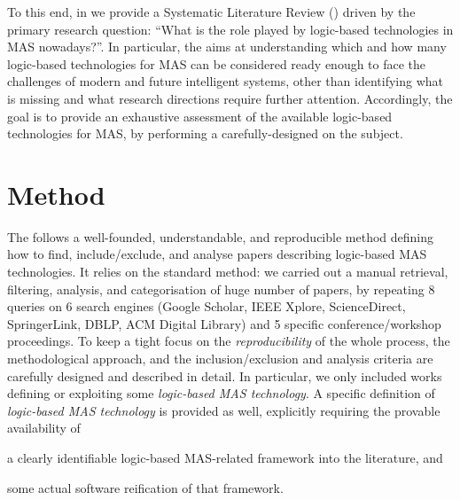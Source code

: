 \documentclass[12pt,a4paper,openright,twoside]{book}
\begin{document}
To this end, in \cite{lptech4mas-jaamas35} we provide a Systematic Literature Review (\slr{}) driven by the primary research question: ``What is the role played by logic-based technologies in MAS nowadays?''.
%
In particular, the \slr{} aims at understanding which and how many logic-based technologies for MAS can be considered ready enough to face the challenges of modern and future intelligent systems, other than identifying what is missing and what research directions require further attention.
%
Accordingly, the goal is to provide an exhaustive assessment of the available logic-based technologies for MAS, by performing a carefully-designed \slr{} on the subject.

\section{Method}

The \slr{} follows a well-founded, understandable, and reproducible method defining how to find, include/exclude, and analyse papers describing logic-based MAS technologies.
%
It relies on the standard \slr{} method: we carried out a manual retrieval, filtering, analysis, and categorisation of huge number of papers, by repeating 8 queries on 6 search engines (Google Scholar, IEEE Xplore, ScienceDirect, SpringerLink, DBLP, ACM Digital Library) and 5 specific conference/workshop proceedings.
%
To keep a tight focus on the \emph{reproducibility} of the whole process, the methodological approach, and the inclusion/exclusion and analysis criteria are carefully designed and described in detail.
%
In particular, we only included works defining or exploiting some \emph{logic-based MAS technology}.
%
A specific definition of \emph{logic-based MAS technology} is provided as well, explicitly requiring the provable availability of
%
\begin{inlinelist}
    \item a clearly identifiable logic-based MAS-related framework into the literature, and
    \item some actual software reification of that framework.
\end{inlinelist}
\end{document}
